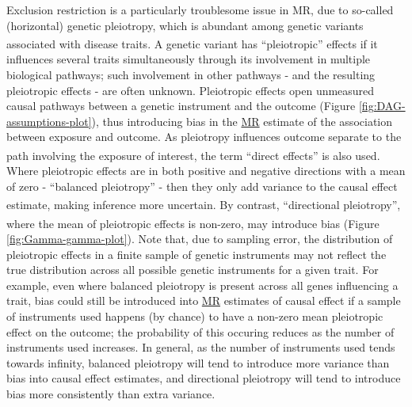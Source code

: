 \documentclass[
]{article}
\begin{document}
Exclusion restriction is a particularly troublesome issue in MR, due to so-called (horizontal) genetic pleiotropy, which is abundant among genetic variants associated with disease traits\textsuperscript{}. A genetic variant has ``pleiotropic'' effects if it influences several traits simultaneously through its involvement in multiple biological pathways; such involvement in other pathways - and the resulting pleiotropic effects - are often unknown. Pleiotropic effects open unmeasured causal pathways between a genetic instrument and the outcome (Figure \ref{fig:DAG-assumptions-plot}), thus introducing bias in the \hyperref[acronyms_MR]{MR} estimate of the association between exposure and outcome. As pleiotropy influences outcome separate to the path involving the exposure of interest, the term ``direct effects'' is also used\textsuperscript{}. Where pleiotropic effects are in both positive and negative directions with a mean of zero - ``balanced pleiotropy'' - then they only add variance to the causal effect estimate, making inference more uncertain\textsuperscript{}. By contrast, ``directional pleiotropy'', where the mean of pleiotropic effects is non-zero, may introduce bias\textsuperscript{} (Figure \ref{fig:Gamma-gamma-plot}). Note that, due to sampling error, the distribution of pleiotropic effects in a finite sample of genetic instruments may not reflect the true distribution across all possible genetic instruments for a given trait. For example, even where balanced pleiotropy is present across all genes influencing a trait, bias could still be introduced into \hyperref[acronyms_MR]{MR} estimates of causal effect if a sample of instruments used happens (by chance) to have a non-zero mean pleiotropic effect on the outcome; the probability of this occuring reduces as the number of instruments used increases. In general, as the number of instruments used tends towards infinity, balanced pleiotropy will tend to introduce more variance than bias into causal effect estimates, and directional pleiotropy will tend to introduce bias more consistently than extra variance.
\end{document}
